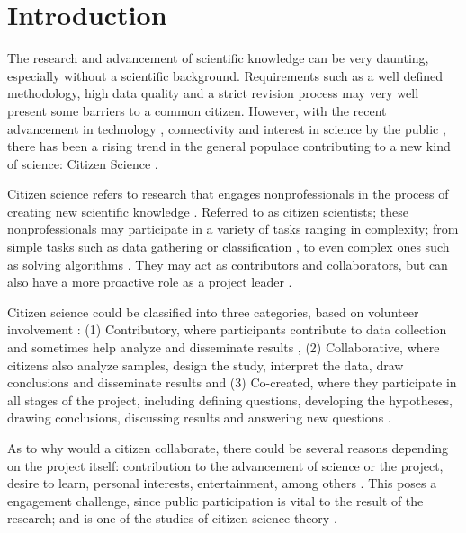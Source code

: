 \chapter*[Introduction]{Introduction}

The research and advancement of scientific knowledge can be very daunting, especially without a scientific background. Requirements such as a well defined methodology, high data quality and a strict revision process may very well present some barriers to a common citizen. However, with the recent advancement in technology \cite{newman2012future}, connectivity \cite{newman2012future} and interest in science by the public \cite{silvertown2009new}, there has been a rising trend in the general populace contributing to a new kind of science: Citizen Science \cite{mckinley2017citizen}.

Citizen science refers to research that engages nonprofessionals in the process of creating new scientific knowledge \cite{bonney2014next}. Referred to as citizen scientists; these nonprofessionals may participate in a variety of tasks ranging in complexity; from simple tasks such as data gathering or classification \cite{barker2013pascal}, to even complex ones such as solving algorithms \cite{cooper2010predicting}. They may act as contributors and collaborators, but can also have a more proactive role as a project leader \cite{robinson2018ten}. 

Citizen science could be classified into three categories, based on volunteer involvement \cite{follett2015analysis}: (1) Contributory, where participants contribute to data collection and sometimes help analyze and disseminate results \cite{bonney2009citizen}, (2) Collaborative, where citizens also analyze samples, design the study, interpret the data, draw conclusions and disseminate results \cite{faridani2009networked} and (3) Co-created, where they participate in all stages of the project, including defining questions, developing the hypotheses, drawing conclusions, discussing results and answering new questions \cite{hill2012notes}.

As to why would a citizen collaborate, there could be several reasons depending on the project itself: contribution to the advancement of science or the project, desire to learn, personal interests, entertainment, among others \cite{tinati2016because}. This poses a engagement challenge, since public participation is vital to the result of the research; and is one of the studies of citizen science theory \cite{bowser2013using}.

